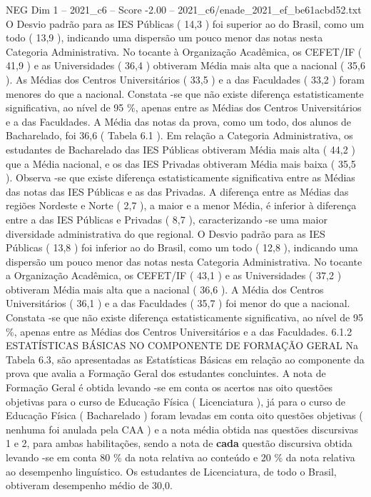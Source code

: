 \begin{textsample}{NEG Dim 1 – 2021\_c6 – Score -2.00 – 2021\_c6/enade\_2021\_ef\_be61acbd52.txt}
O Desvio padrão para as IES Públicas ( 14,3 ) foi superior ao do Brasil, como um todo ( 13,9 ), indicando uma dispersão um pouco menor das notas nesta Categoria Administrativa.
No tocante à Organização Acadêmica, os CEFET/IF ( 41,9 ) e as Universidades ( 36,4 ) obtiveram Média mais alta que a nacional ( 35,6 ).
As Médias dos Centros Universitários ( 33,5 ) e a das Faculdades ( 33,2 ) foram menores do que a nacional.
Constata -se que não existe diferença estatisticamente significativa, ao nível de 95 \%, apenas entre as Médias dos Centros Universitários e a das Faculdades.
A Média das notas da prova, como um todo, dos alunos de Bacharelado, foi 36,6 ( Tabela 6.1 ).
Em relação a Categoria Administrativa, os estudantes de Bacharelado das IES Públicas obtiveram Média mais alta ( 44,2 ) que a Média nacional, e os das IES Privadas obtiveram Média mais baixa ( 35,5 ).
Observa -se que existe diferença estatisticamente significativa entre as Médias das notas das IES Públicas e as das Privadas.
A diferença entre as Médias das regiões Nordeste e Norte ( 2,7 ), a maior e a menor Média, é inferior à diferença entre a das IES Públicas e Privadas ( 8,7 ), caracterizando -se uma maior diversidade administrativa do que regional.
O Desvio padrão para as IES Públicas ( 13,8 ) foi inferior ao do Brasil, como um todo ( 12,8 ), indicando uma dispersão um pouco menor das notas nesta Categoria Administrativa.
No tocante a Organização Acadêmica, os CEFET/IF ( 43,1 ) e as Universidades ( 37,2 ) obtiveram Média mais alta que a nacional ( 36,6 ).
A Média dos Centros Universitários ( 36,1 ) e a das Faculdades ( 35,7 ) foi menor do que a nacional.
Constata -se que não existe diferença estatisticamente significativa, ao nível de 95 \%, apenas entre as Médias dos Centros Universitários e a das Faculdades. 6.1.2 ESTATÍSTICAS BÁSICAS NO COMPONENTE DE FORMAÇÃO GERAL Na Tabela 6.3, são apresentadas as Estatísticas Básicas em relação ao componente da prova que avalia a Formação Geral dos estudantes concluintes.
A nota de Formação Geral é obtida levando -se em conta os acertos nas oito questões objetivas para o curso de Educação Física ( Licenciatura ), já para o curso de Educação Física ( Bacharelado ) foram levadas em conta oito questões objetivas ( nenhuma foi anulada pela CAA ) e a nota média obtida nas questões discursivas 1 e 2, para ambas habilitações, sendo a nota de \textbf{cada} questão discursiva obtida levando -se em conta 80 \% da nota relativa ao conteúdo e 20 \% da nota relativa ao desempenho linguístico.
Os estudantes de Licenciatura, de todo o Brasil, obtiveram desempenho médio de 30,0.

\end{textsample}
